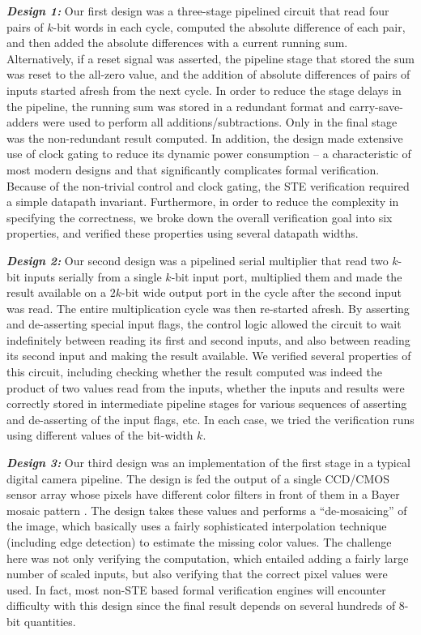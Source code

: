 \documentclass{llncs}
\begin{document}
{\bfseries \emph{Design 1:}} Our first design was a three-stage
pipelined circuit that read four pairs of $k$-bit words in each cycle,
computed the absolute difference of each pair, and then added the
absolute differences with a current running sum.  Alternatively, if a
reset signal was asserted, the pipeline stage that stored the sum was
reset to the all-zero value, and the addition of absolute differences
of pairs of inputs started afresh from the next cycle.  In order to
reduce the stage delays in the pipeline, the running sum was stored in
a redundant format and carry-save-adders were used to perform all
additions/subtractions. Only in the final stage was the non-redundant
result computed. In addition, the design made extensive use of clock
gating to reduce its dynamic power consumption -- a characteristic of
most modern designs and that significantly complicates formal
verification.  Because of the non-trivial control and
clock gating, the STE verification required a simple datapath
invariant.  Furthermore, in order to reduce the complexity in
specifying the correctness, we broke down the overall verification
goal into six properties, and verified these properties using several
datapath widths.

{\bfseries \emph{Design 2:}} Our second design was a pipelined serial
multiplier that read two $k$-bit inputs serially from a single $k$-bit
input port, multiplied them and made the result available on a
$2k$-bit wide output port in the cycle after the second input was
read.  The entire multiplication cycle was then re-started afresh.  By
asserting and de-asserting special input flags, the control logic
allowed the circuit to wait indefinitely between reading its first and
second inputs, and also between reading its second input and making
the result available.  We verified several properties of this circuit,
including checking whether the result computed was indeed the product
of two values read from the inputs, whether the inputs and results
were correctly stored in intermediate pipeline stages for various
sequences of asserting and de-asserting of the input flags, etc.  In
each case, we tried the verification runs using different values of
the bit-width $k$.

{\bfseries \emph{Design 3:}} Our third design was an implementation of
the first stage in a typical digital camera pipeline.  The design is
fed the output of a single CCD/CMOS sensor array whose pixels have
different color filters in front of them in a Bayer mosaic pattern
\cite{MalvarLiWeiCutler04}. The design takes these values and performs
a ``de-mosaicing'' of the image, which basically uses a fairly
sophisticated interpolation technique (including edge detection) to
estimate the missing color values.  The challenge here was not only
verifying the computation, which entailed adding a fairly large number
of scaled inputs, but also verifying that the correct pixel values
were used. In fact, most non-STE based formal verification engines will
encounter difficulty with this design since the final result depends on
several hundreds of $8$-bit quantities.
\end{document}

